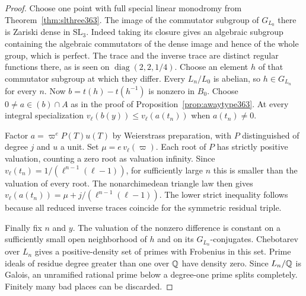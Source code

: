 \documentclass[a4paper,11pt]{article}
\theoremstyle{definition}
\theoremstyle{remark}
\numberwithin{equation}{section}
\begin{document}
\begin{proof}
Choose one point with full special linear monodromy from
Theorem~\ref{thm:slthree363}. The image of the commutator
subgroup of \(G_{L_0}\) there is Zariski dense in
\(\mathrm{SL}_3\). Indeed taking its closure gives an
algebraic subgroup containing the algebraic commutators of
the dense image and hence of the whole group, which is perfect.
The trace and the inverse trace are distinct regular functions
there, as is seen on \(\operatorname{diag}(2,2,1/4)\). Choose
an element \(h\) of that commutator subgroup at which they
differ. Every \(L_n/L_0\) is abelian, so \(h\in G_{L_n}\)
for every \(n\). Now \(b=t(h)-t(h^{-1})\) is nonzero in
\(B_0\). Choose \(0\ne a\in (b)\cap A\) as in the proof of
Proposition~\ref{prop:awaytype363}. At every integral
specialization \(v_\ell(b(y))\le v_\ell(a(t_n))\) when
\(a(t_n)\ne0\).

Factor \(a=\varpi^e P(T)u(T)\) by Weierstrass preparation,
with \(P\) distinguished of degree \(j\) and \(u\) a unit.
Set \(\mu=e\,v_\ell(\varpi)\). Each root of \(P\) has strictly
positive valuation, counting a zero root as valuation infinity.
Since \(v_\ell(t_n)=1/(\ell^{n-1}(\ell-1))\), for sufficiently
large \(n\) this is smaller than the valuation of every root.
The nonarchimedean triangle law then gives
\(v_\ell(a(t_n))=\mu+j/(\ell^{n-1}(\ell-1))\).
The lower strict inequality follows because all reduced inverse
traces coincide for the symmetric residual triple.

Finally fix \(n\) and \(y\). The valuation of the nonzero
difference is constant on a sufficiently small open
neighborhood of \(h\) and on its \(G_{L_n}\)-conjugates.
Chebotarev over \(L_n\) gives a positive-density set of primes
with Frobenius in this set. Prime ideals of residue degree
greater than one over \(\mathbb Q\) have density zero. Since
\(L_n/\mathbb Q\) is Galois, an unramified rational prime below a
degree-one prime splits completely. Finitely many bad places
can be discarded.
\end{proof}
\end{document}
